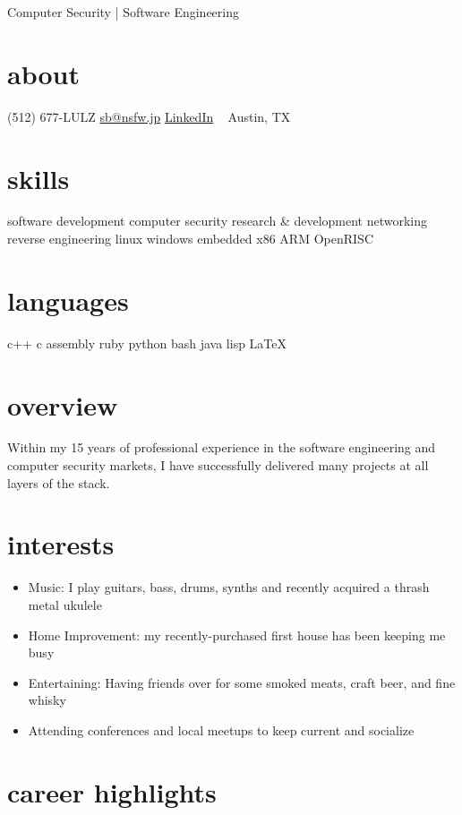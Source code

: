 \documentclass[]{friggeri-cv}
\begin{document}
       {Computer Security | Software Engineering}

\begin{aside}
  \section{about}
  (512) 677-LULZ
  \href{mailto:sb@nsfw.jp}{sb@nsfw.jp}
  \href{http://www.linkedin.com/in/sean-bradly}{LinkedIn}
  ~
  Austin, TX
  \section{skills}
  software development
  computer security
  research \& development
  networking
  reverse engineering
  linux
  windows
  embedded
  x86
  ARM
  OpenRISC
  \section{languages}
  c++
  c
  assembly
  ruby
  python
  bash
  java
  lisp
  \LaTeX
\end{aside}

\section{overview}

Within my 15 years of professional experience in the software
engineering and computer security markets, I have successfully
delivered many projects at all layers of the stack. 

\section{interests}

\begin{itemize}
\item{Music: I play guitars, bass, drums, synths and recently
  acquired a thrash metal ukulele}
\item{Home Improvement: my recently-purchased first house has been keeping me busy}
\item{Entertaining: Having friends over for some smoked meats, craft
  beer, and fine whisky}
\item{Attending conferences and local meetups to keep current
  and socialize}
\end{itemize}

\section{career highlights}
\end{document}
